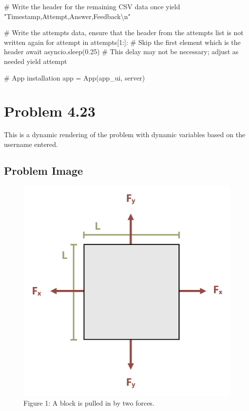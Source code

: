 \documentclass[
  letterpaper,
  DIV=11,
  numbers=noendperiod]{scrreprt}
\newenvironment{Shaded}{\begin{snugshade}}{\end{snugshade}}
\newcommand{\NormalTok}[1]{\textcolor[rgb]{0.00,0.23,0.31}{#1}}
\begin{document}
\begin{Shaded}
\begin{Highlighting}[]
\NormalTok{        \# Write the header for the remaining CSV data once}
\NormalTok{        yield "Timestamp,Attempt,Answer,Feedback\textbackslash{}n"}
        
\NormalTok{        \# Write the attempts data, ensure that the header from the attempts list is not written again}
\NormalTok{        for attempt in attempts[1:]:  \# Skip the first element which is the header}
\NormalTok{            await asyncio.sleep(0.25)  \# This delay may not be necessary; adjust as needed}
\NormalTok{            yield attempt}


\NormalTok{\# App installation}
\NormalTok{app = App(app\_ui, server)}
\end{Highlighting}
\end{Shaded}

\chapter*{Problem 4.23}\label{problem-4.23}


This is a dynamic rendering of the problem with dynamic variables based
on the username entered.

\section*{Problem Image}\label{problem-image-23}


\begin{figure}[H]

{\centering \includegraphics{images/204.png}

}

\caption{Figure 1: A block is pulled in by two forces.}

\end{figure}%
\end{document}
